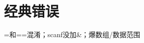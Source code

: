 \documentclass[10pt]{article}
\begin{document}
%
%
%
%
%
\section{经典错误}
=和==混淆；scanf没加\&；爆数组/数据范围
\end{document}
